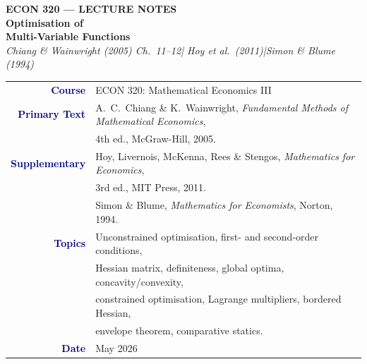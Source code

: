 \documentclass[12pt, a4paper]{article}
\theoremstyle{definition}
\begin{document}

\thispagestyle{empty}

\vspace*{-1.7cm}
\begin{center}
  {\color{white}\large\bfseries\sffamily ECON 320 --- LECTURE NOTES}\\[10pt]
  {\color{white}\Huge\bfseries Optimisation of}\\[6pt]
  {\color{white}\Huge\bfseries Multi-Variable Functions}\\[10pt]
  {\color{gold}\large\itshape
    Chiang \& Wainwright (2005) Ch.\ 11--12\quad|\quad
    Hoy et al.\ (2011)\quad|\quad Simon \& Blume (1994)}
\end{center}

\vspace{3.8cm}
\begin{center}
\begin{tabular}{r l}
  \textbf{\textcolor{navy}{Course}}
    & ECON 320: Mathematical Economics III \\[3pt]
  \textbf{\textcolor{navy}{Primary Text}}
    & A.\ C.\ Chiang \& K.\ Wainwright,
      \textit{Fundamental Methods of Mathematical Economics},\\
    & 4th ed., McGraw-Hill, 2005. \\[3pt]
  \textbf{\textcolor{navy}{Supplementary}}
    & Hoy, Livernois, McKenna, Rees \& Stengos,
      \textit{Mathematics for Economics},\\
    & 3rd ed., MIT Press, 2011. \\[2pt]
    & Simon \& Blume, \textit{Mathematics for Economists},
      Norton, 1994. \\[3pt]
  \textbf{\textcolor{navy}{Topics}}
    & Unconstrained optimisation, first- and second-order conditions,\\
    & Hessian matrix, definiteness, global optima, concavity/convexity,\\
    & constrained optimisation, Lagrange multipliers, bordered Hessian,\\
    & envelope theorem, comparative statics. \\[3pt]
  \textbf{\textcolor{navy}{Date}} & May 2026 \\
\end{tabular}
\end{center}
\end{document}
